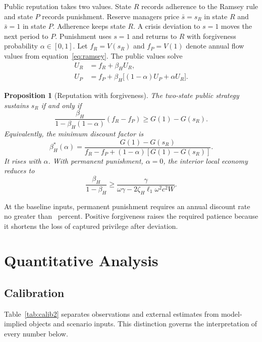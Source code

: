 \documentclass[11pt]{article}
\newtheorem{proposition}{Proposition}
\theoremstyle{definition}
\begin{document}
Public reputation takes two values. State $R$ records adherence to the Ramsey rule and state $P$ records punishment. Reserve managers price $\bar s=s_R$ in state $R$ and $\bar s=1$ in state $P$. Adherence keeps state $R$. A crisis deviation to $s=1$ moves the next period to $P$. Punishment uses $s=1$ and returns to $R$ with forgiveness probability $\alpha\in[0,1]$. Let $f_R=V(s_R)$ and $f_P=V(1)$ denote annual flow values from equation~\eqref{eq:ramsey}. The public values solve
\begin{align}
U_R&=f_R+\beta_HU_R,\\
U_P&=f_P+\beta_H\big[(1-\alpha)U_P+\alpha U_R\big].
\label{eq:publicstate}
\end{align}

\begin{proposition}[Reputation with forgiveness]\label{prop:reputation}
The two-state public strategy sustains $s_R$ if and only if
\begin{equation}
\frac{\beta_H}{1-\beta_H(1-\alpha)}(f_R-f_P)
\geq G(1)-G(s_R).
\label{eq:reputation}
\end{equation}
Equivalently, the minimum discount factor is
\[
\beta_H^*(\alpha)=
\frac{G(1)-G(s_R)}
{f_R-f_P+(1-\alpha)[G(1)-G(s_R)]}.
\]
It rises with $\alpha$. With permanent punishment, $\alpha=0$, the interior local economy reduces to
\[
\frac{\beta_H}{1-\beta_H}
\geq
\frac{\gamma}{\omega\gamma-2\zeta_H\ell_1\omega^2c^2W}.
\]
\end{proposition}

At the baseline inputs, permanent punishment requires an annual discount rate no greater than \RateRepBase\ percent. Positive forgiveness raises the required patience because it shortens the loss of captured privilege after deviation.

\section{Quantitative Analysis}\label{sec:quant}

\subsection{Calibration}

Table~\ref{tab:calib2} separates observations and external estimates from model-implied objects and scenario inputs. This distinction governs the interpretation of every number below.
\end{document}
